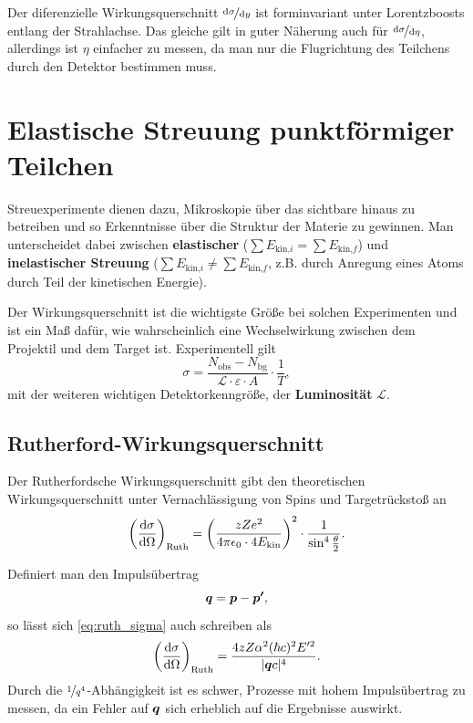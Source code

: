 Der diferenzielle Wirkungsquerschnitt $\nicefrac{\text{d}\sigma}{\text{d}y}$ ist forminvariant unter Lorentzboosts entlang der Strahlachse.
Das gleiche gilt in guter Näherung auch für $\nicefrac{\text{d}\sigma}{\text{d}\eta}$, allerdings ist $\eta$ einfacher zu messen, da man nur die Flugrichtung des Teilchens durch den Detektor bestimmen muss.

\section{Elastische Streuung punktförmiger Teilchen}
Streuexperimente dienen dazu, Mikroskopie über das sichtbare hinaus zu betreiben und so Erkenntnisse über die Struktur der Materie zu gewinnen.
Man unterscheidet dabei zwischen \textbf{elastischer} ($\sum E_{\text{kin,}i} = \sum E_{\text{kin,}f}$) und \textbf{inelastischer Streuung} ($\sum E_{\text{kin,}i} \neq \sum E_{\text{kin,}f}$, z.B. durch Anregung eines Atoms durch Teil der kinetischen Energie).

Der Wirkungsquerschnitt ist die wichtigste Größe bei solchen Experimenten und ist ein Maß dafür, wie wahrscheinlich eine Wechselwirkung zwischen dem Projektil und dem Target ist.
Experimentell gilt
\begin{equation*}
	\sigma = \frac{N_\text{obs}-N_\text{bg}}{\mathcal{L}\cdot\varepsilon\cdot A}\cdot\frac{1}{T},
\end{equation*}
mit der weiteren wichtigen Detektorkenngröße, der \textbf{Luminosität} $\mathcal{L}$.

\subsection{Rutherford-Wirkungsquerschnitt}
Der Rutherfordsche Wirkungsquerschnitt gibt den theoretischen Wirkungsquerschnitt unter Vernachlässigung von Spins und Targetrückstoß an
\begin{equation}\label{eq:ruth_sigma}
	\left(\diff[\sigma]{\Omega}\right)_\text{Ruth} = \left(\frac{zZe^2}{4\pi\epsilon_0\cdot 4E_\text{kin}}\right)^2\cdot\frac{1}{\sin^4\frac{\theta}{2}}.
\end{equation}

Definiert man den Impulsübertrag
\begin{equation*}
	\mvec{q} = \mvec{p}-\mvec{p'},
\end{equation*}
so lässt sich \autoref{eq:ruth_sigma} auch schreiben als
\begin{equation*}
	\left(\diff[\sigma]{\Omega}\right)_\text{Ruth} = \frac{4zZ\alpha^2(\hbar c)^2 E'^2}{|\mvec{q}c|^4}.
\end{equation*}
Durch die $\nicefrac{1}{q^4}$-Abhängigkeit ist es schwer, Prozesse mit hohem Impulsübertrag zu messen, da ein Fehler auf $\mvec{q}$ sich erheblich auf die Ergebnisse auswirkt.

